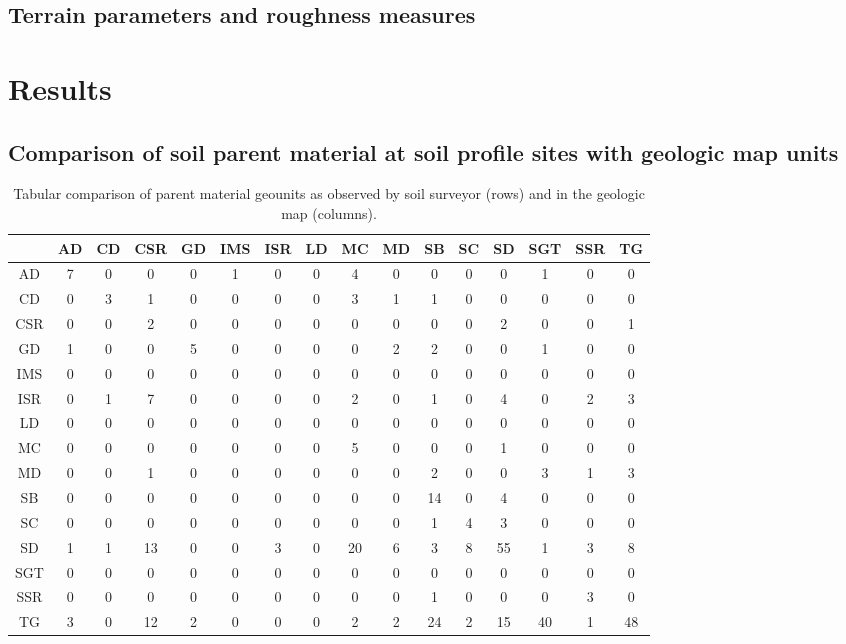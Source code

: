 \documentclass[preprint,12pt,authoryear]{elsarticle}
\begin{document}
\subsection{Terrain parameters and roughness measures}
\citep{Riley1999}
\section{Results}
\subsection{Comparison of soil parent material at soil profile sites with geologic map units}
\begin{table}[ht]
\centering
\tabcolsep=0.10cm
\begin{tabular}{cccccccccccccccc}
  \hline
 & AD & CD & CSR & GD & IMS & ISR & LD & MC & MD & SB & SC & SD & SGT & SSR & TG \\ 
  \hline
AD &   7 &   0 &   0 &   0 &   1 &   0 &   0 &   4 &   0 &   0 &   0 &   0 &   1 &   0 &   0 \\ 
  CD &   0 &   3 &   1 &   0 &   0 &   0 &   0 &   3 &   1 &   1 &   0 &   0 &   0 &   0 &   0 \\ 
  CSR &   0 &   0 &   2 &   0 &   0 &   0 &   0 &   0 &   0 &   0 &   0 &   2 &   0 &   0 &   1 \\ 
  GD &   1 &   0 &   0 &   5 &   0 &   0 &   0 &   0 &   2 &   2 &   0 &   0 &   1 &   0 &   0 \\ 
  IMS &   0 &   0 &   0 &   0 &   0 &   0 &   0 &   0 &   0 &   0 &   0 &   0 &   0 &   0 &   0 \\ 
  ISR &   0 &   1 &   7 &   0 &   0 &   0 &   0 &   2 &   0 &   1 &   0 &   4 &   0 &   2 &   3 \\ 
  LD &   0 &   0 &   0 &   0 &   0 &   0 &   0 &   0 &   0 &   0 &   0 &   0 &   0 &   0 &   0 \\ 
  MC &   0 &   0 &   0 &   0 &   0 &   0 &   0 &   5 &   0 &   0 &   0 &   1 &   0 &   0 &   0 \\ 
  MD &   0 &   0 &   1 &   0 &   0 &   0 &   0 &   0 &   0 &   2 &   0 &   0 &   3 &   1 &   3 \\ 
  SB &   0 &   0 &   0 &   0 &   0 &   0 &   0 &   0 &   0 &  14 &   0 &   4 &   0 &   0 &   0 \\ 
  SC &   0 &   0 &   0 &   0 &   0 &   0 &   0 &   0 &   0 &   1 &   4 &   3 &   0 &   0 &   0 \\ 
  SD &   1 &   1 &  13 &   0 &   0 &   3 &   0 &  20 &   6 &   3 &   8 &  55 &   1 &   3 &   8 \\ 
  SGT &   0 &   0 &   0 &   0 &   0 &   0 &   0 &   0 &   0 &   0 &   0 &   0 &   0 &   0 &   0 \\ 
  SSR &   0 &   0 &   0 &   0 &   0 &   0 &   0 &   0 &   0 &   1 &   0 &   0 &   0 &   3 &   0 \\ 
  TG &   3 &   0 &  12 &   2 &   0 &   0 &   0 &   2 &   2 &  24 &   2 &  15 &  40 &   1 &  48 \\ 
   \hline
\end{tabular}
\caption{Tabular comparison of parent material geounits as observed by soil surveyor (rows) and in the geologic map (columns).} 
\label{kartiergegenkarte}
\end{table}
\end{document}

